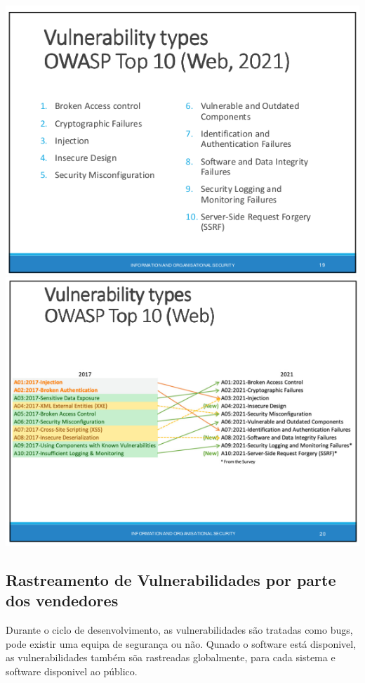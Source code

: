 \documentclass{article}
\begin{document}
  \begin{center}
    \includegraphics[scale=0.35]{11}
    \includegraphics[scale=0.35]{12}
  \end{center}

  \subsection{Rastreamento de Vulnerabilidades por parte dos vendedores}

  Durante o ciclo de desenvolvimento, as vulnerabilidades são tratadas como bugs,
  pode existir uma equipa de segurança ou não. Qunado o software está disponivel,
  as vulnerabilidades também sõa rastreadas globalmente, para cada sistema
  e software disponivel ao público.
\end{document}
